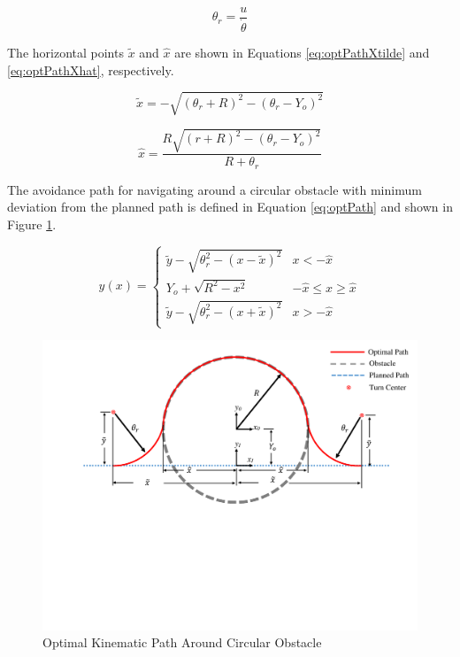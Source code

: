 \documentclass[numbered,pdftex]{ohio-etd}
\begin{document}
\begin{equation}
\label{eq:turnRadius}
\theta_r = \frac{u}{\dot{\theta}}
\end{equation}

\noindent
The horizontal points $\tilde{x}$ and $\hat{x}$ are shown in Equations \ref{eq:optPathXtilde} and \ref{eq:optPathXhat}, respectively. 

\begin{equation}
\label{eq:optPathXtilde}
\widetilde{x} = -\sqrt{(\theta_r+R)^2 - (\theta_r-Y_o)^2}
\end{equation}

\begin{equation}
\label{eq:optPathXhat}
\hat{x} = \frac{R\sqrt{(r+R)^2-(\theta_r-Y_o)^2}}{R+\theta_r}
\end{equation}

\noindent
The avoidance path for navigating around a circular obstacle with minimum deviation from the planned path is defined in Equation \ref{eq:optPath} and shown in Figure \ref{fig:optimalpath}.


\begin{equation}
\label{eq:optPath}
y(x) = \left\{
\begin{array}{ll}
\widetilde{y} -\sqrt{\theta_r^2 - (x-\widetilde{x})^2} &  x < -\hat{x} \\
Y_o +\sqrt{R^2 - x^2} & -\hat{x} \leq x \geq \hat{x}\\
\widetilde{y} -\sqrt{\theta_r^2 - (x+\widetilde{x})^2}&  x > -\hat{x}
\end{array}
\right.
\end{equation}

\begin{figure}[H]
	\centering
	\includegraphics[width=0.7\linewidth ,trim=0 265 0 20,clip,width=15cm]{Figures/optimalPath/optimalPath}
	\caption{Optimal Kinematic Path Around Circular Obstacle}
	\label{fig:optimalpath}
\end{figure}
\end{document}
